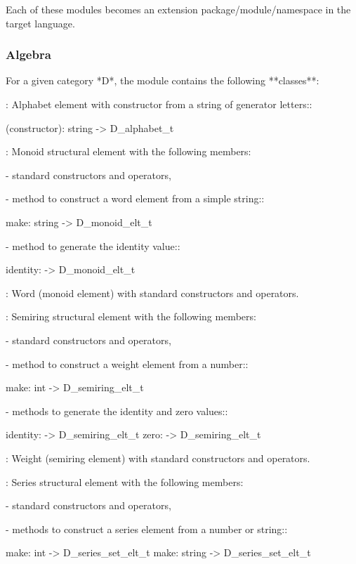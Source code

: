 Each of these modules becomes an extension package/module/namespace in
the target language.

\subsubsection{Algebra}

For  a   given  category  *D*,   the  module  
contains the following **classes**:

:
     Alphabet element with constructor from a string of generator
     letters::

        (constructor): string -> D\_alphabet\_t

:
     Monoid structural element with the following members:

     - standard \Vauc constructors and operators,

     - method to construct a word element from a simple string::

        make: string -> D\_monoid\_elt\_t

     - method to generate the identity value::

        identity: -> D\_monoid\_elt\_t

:
     Word  (monoid element) with  standard \Vauc  constructors and
     operators.


:
      Semiring structural element with the following members:

      - standard \Vauc constructors and operators,

      - method to construct a weight element from a number::

         make: int -> D\_semiring\_elt\_t

      - methods to generate the identity and zero values::

         identity: -> D\_semiring\_elt\_t
         zero: -> D\_semiring\_elt\_t

:
     Weight  (semiring element)  with standard  \Vauc constructors
     and operators.

:
      Series structural element with the following members:

      - standard \Vauc constructors and operators,

      - methods to construct a series element from a number or
        string::

          make: int -> D\_series\_set\_elt\_t
          make: string -> D\_series\_set\_elt\_t

